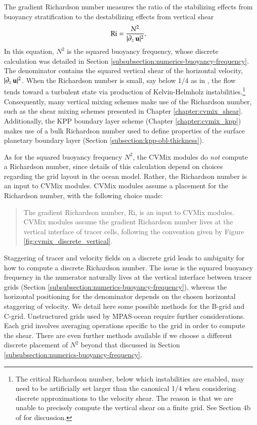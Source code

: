 The gradient Richardson number measures the ratio of the stabilizing
effects from buoyancy stratification to the destabilizing effects from
vertical shear
\begin{equation}
  \mbox{Ri}= \frac{N^{2} }{ |\partial_{z} \, {\bf u}|^{2} }.
\label{eq:flux-Richardson-elements}
\end{equation}
In this equation, $N^{2}$ is the squared buoyancy frequency, whose
discrete calculation was detailed in Section
\ref{subsubsection:numerics-buoyancy-frequency}.  The denominator
contains the squared vertical shear of the horizontal velocity,
$|\partial_{z} \, {\bf u}|^{2}$.  When the Richardson number is small,
say below 1/4 as in \cite{miles1961}, the flow tends toward a
turbulent state via production of Kelvin-Helmholz
instabilities.\footnote{The critical Richardson number, below which
  instabilities are enabled, may need to be artificially set larger
  than the canonical 1/4 when considering discrete approximations to
  the velocity shear.  The reason is that we are unable to precisely
  compute the vertical shear on a finite grid.  See Section 4b of
  \cite{Jacksonetal2008} for discussion.}  Consequently, many vertical
mixing schemes make use of the Richardson number, such as the shear
mixing schemes presented in Chapter \ref{chapter:cvmix_shear}.
Additionally, the KPP boundary layer scheme (Chapter
\ref{chapter:cvmix_kpp}) makes use of a bulk Richardson number used to
define properties of the surface planetary boundary layer (Section
\ref{subsection:kpp-obl-thickness}).

As for the squared buoyancy frequency $N^{2}$, the CVMix modules do
{\it not} compute a Richardson number, since details of this
calculation depend on choices regarding the grid layout in the ocean
model.  Rather, the Richardson number is an input to CVMix modules.
CVMix modules assume a placement for the Richardson number, with the
following choice made:
\begin{mdframed}[backgroundcolor=lightgray!50]
\begin{quote}
  {\sf The gradient Richardson number, $\mbox{Ri}$, is an input to
    CVMix modules.  CVMix modules assume the gradient Richardson
    number lives at the vertical interface of tracer cells, following
    the convention given by Figure
    \ref{fig:cvmix_discrete_vertical}.}
\end{quote}
\end{mdframed}

Staggering of tracer and velocity fields on a discrete grid leads to
ambiguity for how to compute a discrete Richardson number.  The issue
is the squared buoyancy frequency in the numerator naturally lives at
the vertical interface between tracer grids (Section
\ref{subsubsection:numerics-buoyancy-frequency}), whereas the
horizontal positioning for the denominator depends on the chosen
horizontal staggering of velocity.  We detail here some possible
methods for the B-grid and C-grid.  Unstructured grids used by
MPAS-ocean require further considerations.  Each grid involves
averaging operations specific to the grid in order to compute the
shear.  There are even further methods available if we choose a
different discrete placement of $N^{2}$ beyond that discussed in
Section \ref{subsubsection:numerics-buoyancy-frequency}.


